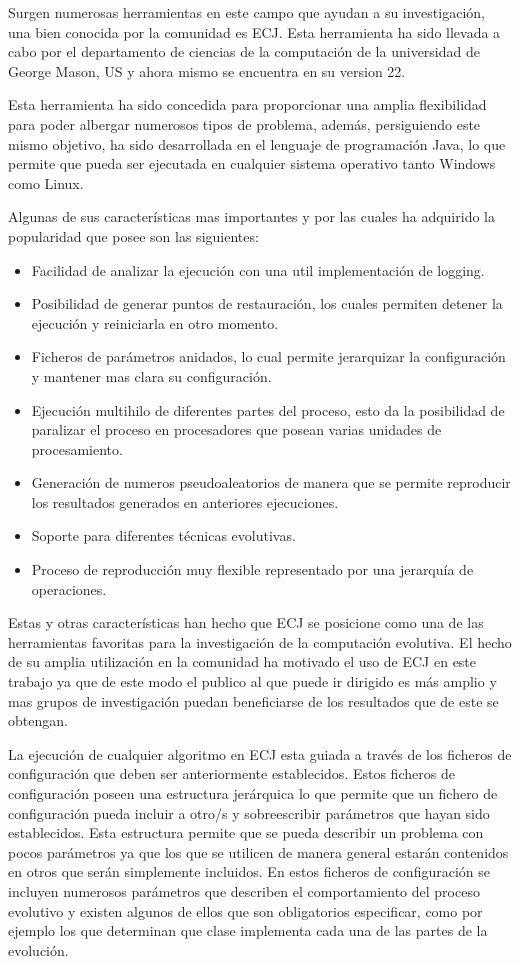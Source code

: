 Surgen numerosas herramientas en este campo que ayudan a su investigación, una bien conocida por la comunidad es ECJ. 
Esta herramienta ha sido llevada a cabo por el departamento de ciencias de la computación de la universidad de George Mason, US y ahora mismo se encuentra en su version 22.

Esta herramienta ha sido concedida para proporcionar una amplia flexibilidad para poder albergar numerosos tipos de problema, adem\'as, persiguiendo este mismo objetivo, ha sido desarrollada en el lenguaje de programación Java, lo que permite que pueda ser ejecutada en cualquier sistema operativo tanto Windows como Linux.

Algunas de sus características mas importantes y por las cuales ha adquirido la popularidad que posee son las siguientes:

\begin{itemize}
	\item Facilidad de analizar la ejecución con una util implementación de logging.
	\item Posibilidad de generar puntos de restauración, los cuales permiten detener la ejecución y reiniciarla en otro momento.
	\item Ficheros de parámetros anidados, lo cual permite jerarquizar la configuración y mantener mas clara su configuración.
	\item Ejecución multihilo de diferentes partes del proceso, esto da la posibilidad de paralizar el proceso en procesadores que posean varias unidades de procesamiento.
	\item Generación de numeros pseudoaleatorios de manera que se permite reproducir los resultados generados en anteriores ejecuciones.
	\item Soporte para diferentes técnicas evolutivas.
	\item Proceso de reproducción muy flexible representado por una jerarquía de operaciones.
\end{itemize}

Estas y otras características han hecho que ECJ se posicione como una de las herramientas favoritas para la investigación de la computación evolutiva. El hecho de su amplia utilización en la comunidad ha motivado el uso de ECJ en este trabajo ya que de este modo el publico al que puede ir dirigido es m\'as amplio y mas grupos de investigación puedan beneficiarse de los resultados que de este se obtengan.

La ejecución de cualquier algoritmo en ECJ esta guiada a través de los ficheros de configuración que deben ser anteriormente establecidos. Estos ficheros de configuración poseen una estructura jerárquica lo que permite que un fichero de configuración pueda incluir a otro/s y sobreescribir parámetros que hayan sido establecidos. Esta estructura permite que se pueda describir un problema con pocos parámetros ya que los que se utilicen de manera general estarán contenidos en otros que ser\'an simplemente incluidos. En estos ficheros de configuración se incluyen numerosos parámetros que describen el comportamiento del proceso evolutivo y existen algunos de ellos que son obligatorios especificar, como por ejemplo los que determinan que clase implementa cada una de las partes de la evolución.

